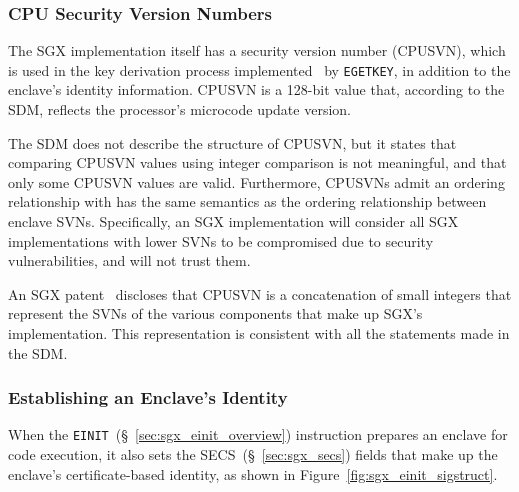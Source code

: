 \subsubsection{CPU Security Version Numbers}
\label{sec:sgx_cpusvn}


The SGX implementation itself has a security version number (CPUSVN), which is
used in the key derivation process implemented~\cite{intel2013patent1} by
\texttt{EGETKEY}, in addition to the enclave's identity information. CPUSVN is
a 128-bit value that, according to the SDM, reflects the processor's microcode
update version.


The SDM does not describe the structure of CPUSVN, but it states that comparing
CPUSVN values using integer comparison is not meaningful, and that only some
CPUSVN values are valid. Furthermore, CPUSVNs admit an ordering relationship
with has the same semantics as the ordering relationship between enclave SVNs.
Specifically, an SGX implementation will consider all SGX implementations with
lower SVNs to be compromised due to security vulnerabilities, and will not
trust them.

An SGX patent~\cite{intel2013patent1} discloses that CPUSVN is a concatenation
of small integers that represent the SVNs of the various components that make
up SGX's implementation. This representation is consistent with all the
statements made in the SDM.


\subsubsection{Establishing an Enclave's Identity}
\label{sec:sgx_einit_sigstruct}

When the \texttt{EINIT}~(\S~\ref{sec:sgx_einit_overview}) instruction prepares
an enclave for code execution, it also sets the SECS~(\S~\ref{sec:sgx_secs})
fields that make up the enclave's certificate-based identity, as shown in
Figure~\ref{fig:sgx_einit_sigstruct}.


